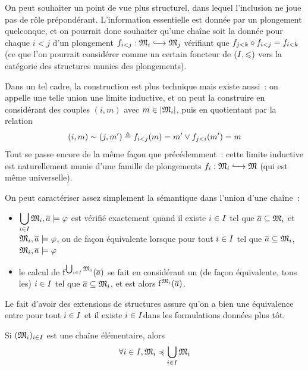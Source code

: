 \begin{remark}
  On peut souhaiter un point de vue plus structurel, dans lequel l'inclusion
  ne joue pas de rôle prépondérant. L'information essentielle est donnée par un
  plongement quelconque, et on pourrait donc souhaiter qu'une chaîne soit la
  donnée pour chaque $i < j$ d'un plongement
  $f_{i < j} : \displaystyle \mathfrak{M}_i \xhookrightarrow{\quad} \mathfrak{M}_j$
  vérifiant que $f_{j < k}\circ f_{i < j} = f_{i < k}$
  (ce que l'on pourrait considérer comme un certain foncteur de
  $(I,\leqslant)$ vers la catégorie des structures munies des plongements).

  Dans un tel cadre, la construction est plus technique mais existe aussi~: on
  appelle une telle union une limite inductive, et on peut la construire en
  considérant des couples $(i,m)$ avec $m \in \left\vert \mathfrak{M}_i\right\vert$, puis en
  quotientant par la relation
  \[(i,m)\sim (j,m') \triangleq
  f_{i < j}(m) = m' \lor f_{j < i}(m') = m\]
  Tout se passe encore de la même façon que précédemment~: cette limite
  inductive est naturellement munie d'une famille de plongements
  $f_i : \displaystyle \mathfrak{M}_i \xhookrightarrow{\quad} \mathfrak{M}$ (qui est même universelle).
\end{remark}

\begin{remark}
  On peut caractériser assez simplement la sémantique dans l'union d'une
  chaîne~:
  \begin{itemize}
  \item $\displaystyle\bigcup_{i \in I}\mathfrak{M}_i,\overline{a}\models\varphi$ est
    vérifié exactement quand il existe $i\in I$ tel que
    $\overline{a} \subseteq \mathfrak{M}_i$ et $\mathfrak{M}_i,\overline{a} \models\varphi$, ou de
    façon équivalente lorsque pour tout $i \in I$ tel que
    $\overline{a}\subseteq\mathfrak{M}_i$, $\mathfrak{M}_i,\overline{a} \models\varphi$
  \item le calcul de $\mathrm{f}^{\bigcup_{i \in I}\mathfrak{M}_i}(\overline{a})$ se
    fait en considérant un (de façon équivalente, tous les) $i \in I$
    tel que $\overline{a} \subseteq \mathfrak{M}_i$, et est alors
    $\mathrm{f}^{\mathfrak{M}_i}(\overline{a})$.
  \end{itemize}
  Le fait d'avoir des extensions de structures assure qu'on a bien une
  équivalence entre \og pour tout $i \in I$ \fg et \og il existe
  $i \in I$\fg dans les formulations données plus tôt.
\end{remark}

\begin{lemma}
  \label{lem.chaine.elem.tarski}
  Si $(\mathfrak{M}_i)_{i \in I}$ est une chaîne élémentaire, alors
  \[\forall i \in I, \mathfrak{M}_i\preccurlyeq\bigcup_{i \in I}\mathfrak{M}_i\]
\end{lemma}

